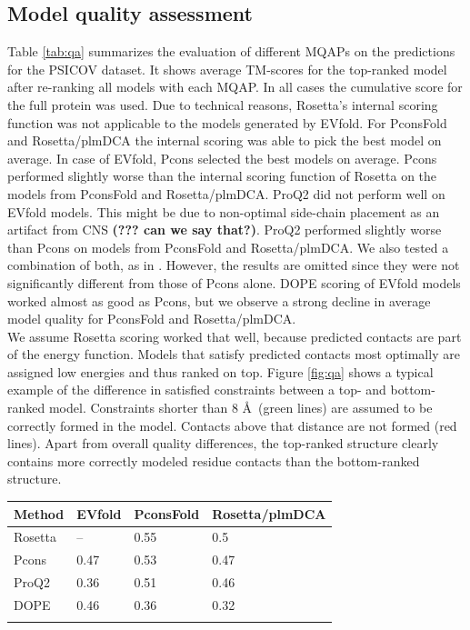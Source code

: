 \documentclass{bioinfo}
\begin{document}
\subsection{Model quality assessment}
Table \ref{tab:qa} summarizes the evaluation of different MQAPs on the predictions for the PSICOV dataset. It shows average TM-scores for the top-ranked model after re-ranking all models with each MQAP. In all cases the cumulative score for the full protein was used. Due to technical reasons, Rosetta's internal scoring function was not applicable to the models generated by EVfold. For PconsFold and Rosetta/plmDCA the internal scoring was able to pick the best model on average. In case of EVfold, Pcons selected the best models on average. Pcons performed slightly worse than the internal scoring function of Rosetta on the models from PconsFold and Rosetta/plmDCA. ProQ2 did not perform well on EVfold models. This might be due to non-optimal side-chain placement as an artifact from CNS {\bf(??? can we say that?)}. ProQ2 performed slightly worse than Pcons on models from PconsFold and Rosetta/plmDCA. We also tested a combination of both, as in \citeauthor{wallner_pcons.net:_2007} \citeyear{wallner_pcons.net:_2007}. However, the results are omitted since they were not significantly different from those of Pcons alone. DOPE scoring of EVfold models worked almost as good as Pcons, but we observe a strong decline in average model quality for PconsFold and Rosetta/plmDCA. \\\indent
We assume Rosetta scoring worked that well, because predicted contacts are part of the energy function. Models that satisfy predicted contacts most optimally are assigned low energies and thus ranked on top. Figure \ref{fig:qa} shows a typical example of the difference in satisfied constraints between a top- and bottom-ranked model. Constraints shorter than 8 \AA\ (green lines) are assumed to be correctly formed in the model. Contacts above that distance are not formed (red lines). Apart from overall quality differences, the top-ranked structure clearly contains more correctly modeled residue contacts than the bottom-ranked structure.\\\indent

\begin{table}[!t]
{\begin{tabular}{llll}\toprule
Method & EVfold & PconsFold & Rosetta/plmDCA \\ \midrule
Rosetta & -- & 0.55 & 0.5 \\
Pcons & 0.47 & 0.53 & 0.47 \\
ProQ2 & 0.36 & 0.51 & 0.46 \\
DOPE & 0.46 & 0.36 & 0.32 \\ \botrule
\end{tabular}}{}
\end{table}
\end{document}
